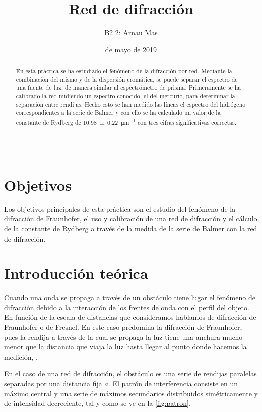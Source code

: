 \documentclass[12pt]{article}
\title{\sffamily {\bfseries Práctica 9:} Red de difracción}
\author{\sffamily B2 2: Arnau Mas}
\date{\sffamily 14 de mayo de 2019}
\numberwithin{table}{section}
\numberwithin{figure}{section}
\numberwithin{equation}{section}
\newcommand{\data}[3]{\SI{#1 \pm #2}{#3}}
\begin{document}
\maketitle
\renewcommand{\abstractname}{\sffamily \bfseries Resumen:}
\begin{abstract}
En esta práctica se ha estudiado el fenómeno de la difracción por red. Mediante la combinación del mismo y de la dispersión cromática, se puede separar el espectro de una fuente de luz, de manera similar al espectrómetro de prisma. Primeramente se ha calibrado la red midiendo un espectro conocido, el del mercurio, para determinar la separación entre rendijas. Hecho esto se han medido las líneas el espectro del hidrógeno correspondientes a la serie de Balmer y con ello se ha calculado un valor de la constante de Rydberg de \data{10.98}{0.22}{\micro m^{-1}} con tres cifras significativas correctas. 
\end{abstract}
\hrule

\section{Objetivos}
Los objetivos principales de esta práctica son el estudio del fenómeno de la difracción de Fraunhofer, el uso y calibración de una red de difracción y el cálculo de la constante de Rydberg a través de la medida de la serie de Balmer con la red de difracción.


\section{Introducción teórica}
Cuando una onda se propaga a través de un obstáculo tiene lugar el fenómeno de difracción debido a la interacción de los frentes de onda con el perfil del objeto. En función de la escala de distancias que consideramos hablamos de difracción de Fraunhofer o de Fresnel. En este caso predomina la difracción de Fraunhofer, pues la rendija a través de la cual se propaga la luz tiene una anchura mucho menor que la distancia que viaja la luz hasta llegar al punto donde hacemos la medición, \cite{hecht}. 

En el caso de una red de difracción, el obstáculo es una serie de rendijas paralelas separadas por una distancia fija \( a \). El patrón de interferencia consiste en un máximo central y una serie de máximos secundarios distribuidos simétricamente y de intensidad decreciente, tal y como se ve en la \cref{fig:patron}.
\end{document}
